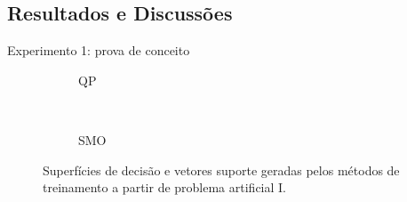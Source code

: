 \documentclass{beamer}
\newcommand{\tabela}[3]{
\begin{table}[!htbp]
  \scalefont{#3}
  \begin{center}
  \caption{#2}\label{tab:#1}
    
  \end{center}
\end{table}
}
\begin{document}



\subsection{Resultados e Discussões}

\begin{frame}{Experimento 1: prova de conceito}
\begin{figure}[H]
    \begin{center}  
      \begin{subfigure}[b]{.40\textwidth}
        \caption{QP}
      \end{subfigure}
      ~
      \begin{subfigure}[b]{.40\textwidth}
        \caption{SMO}
      \end{subfigure}
      
    \end{center}
    \caption{Superfícies de decisão e vetores suporte geradas pelos métodos de treinamento a partir de problema artificial I.}\label{fig:simulacoes-pa-i-resultados}
\end{figure}
\end{frame}
\end{document}
